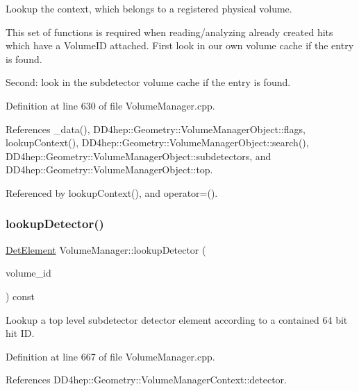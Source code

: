 Lookup the context, which belongs to a registered physical volume. 

This set of functions is required when reading/analyzing already created hits which have a Volume\+ID attached. First look in our own volume cache if the entry is found.

Second\+: look in the subdetector volume cache if the entry is found. 

Definition at line 630 of file Volume\+Manager.\+cpp.



References \+\_\+data(), D\+D4hep\+::\+Geometry\+::\+Volume\+Manager\+Object\+::flags, lookup\+Context(), D\+D4hep\+::\+Geometry\+::\+Volume\+Manager\+Object\+::search(), D\+D4hep\+::\+Geometry\+::\+Volume\+Manager\+Object\+::subdetectors, and D\+D4hep\+::\+Geometry\+::\+Volume\+Manager\+Object\+::top.



Referenced by lookup\+Context(), and operator=().

\hypertarget{class_d_d4hep_1_1_geometry_1_1_volume_manager_a1b674c835b5dc04d22ab1e4c2cd52775}{}\label{class_d_d4hep_1_1_geometry_1_1_volume_manager_a1b674c835b5dc04d22ab1e4c2cd52775} 
\subsubsection{\texorpdfstring{lookup\+Detector()}{lookupDetector()}}
{\footnotesize\ttfamily \hyperlink{class_d_d4hep_1_1_geometry_1_1_det_element}{Det\+Element} Volume\+Manager\+::lookup\+Detector (\begin{DoxyParamCaption}\item[{\hyperlink{class_d_d4hep_1_1_geometry_1_1_volume_manager_ab1f746b561c93be38bc7c6e66fc8ca8a}{Volume\+ID}}]{volume\+\_\+id }\end{DoxyParamCaption}) const}



Lookup a top level subdetector detector element according to a contained 64 bit hit ID. 



Definition at line 667 of file Volume\+Manager.\+cpp.



References D\+D4hep\+::\+Geometry\+::\+Volume\+Manager\+Context\+::detector.



